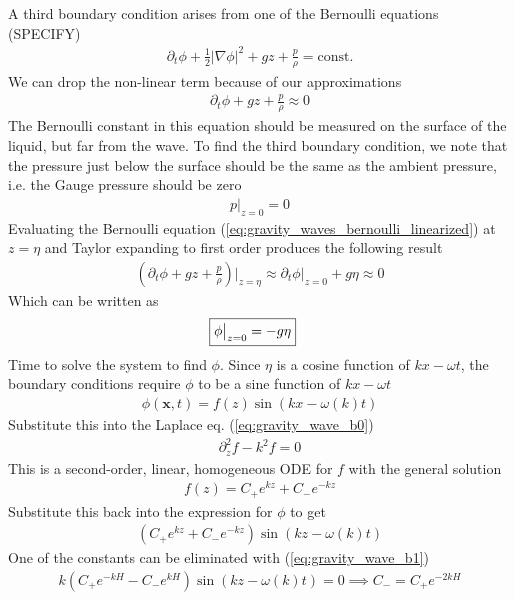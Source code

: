 \documentclass[a4paper, 12pt]{article}
\numberwithin{equation}{subsubsection}
\begin{document}
A third boundary condition arises from one of the Bernoulli equations (SPECIFY)
\begin{align}
	\partial_t \phi + \frac{1}{2}|\nabla \phi|^2 + g z + \frac{p}{\rho} = \text{const.}
\end{align}
We can drop the non-linear term because of our approximations
\begin{align}
	\partial_t \phi + g z + \frac{p}{\rho} \approx 0 \label{eq:gravity_waves_bernoulli_linearized}
\end{align}
The Bernoulli constant in this equation should be measured on the surface of the liquid, but far from the wave. To find the third boundary condition, we note that the pressure just below the surface should be the same as the ambient pressure, i.e. the Gauge pressure should be zero
\begin{align}
	p \big|_{z=0} = 0
\end{align}
Evaluating the Bernoulli equation (\ref{eq:gravity_waves_bernoulli_linearized}) at $z=\eta$ and Taylor expanding to first order produces the following result
\begin{align}
	\left( \partial_t \phi + g z + \frac{p}{\rho} \right) \big|_{z=\eta} \approx \partial_t \phi \big|_{z=0} + g \eta  \approx 0
\end{align}
Which can be written as
\begin{align}
	\Aboxed{\phi \big|_{z=0} = - g \eta} \label{eq:gravity_wave_b3}
\end{align}
Time to solve the system to find $\phi$. Since $\eta$ is a cosine function of $kx - \omega t$, the boundary conditions require $\phi$ to be a sine function of $kx - \omega t$
\begin{align}
	\phi (\mathbf{x}, t) = f(z) \sin(kx - \omega(k) t)
\end{align}
Substitute this into the Laplace eq. (\ref{eq:gravity_wave_b0})
\begin{align}
	\partial^2_z f - k^2 f = 0
\end{align}
This is a second-order, linear, homogeneous ODE for $f$ with the general solution
\begin{align}
	f(z) = C_+e^{kz} + C_- e^{-kz}
\end{align}
Substitute this back into the expression for $\phi$ to get
\begin{align}
	(C_+e^{kz} + C_- e^{-kz})\sin(kz - \omega (k) t)
\end{align}
One of the constants can be eliminated with (\ref{eq:gravity_wave_b1})
\begin{align}
	k(C_+e^{-kH} - C_- e^{kH})\sin(kz - \omega (k) t) = 0 \implies C_- = C_+ e^{-2kH}
\end{align}
\end{document}
